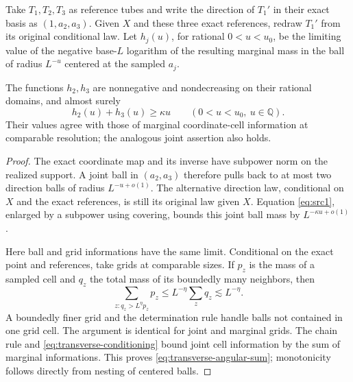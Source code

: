Take $T_1,T_2,T_3$ as reference tubes and write the direction of $T_1'$
in their exact basis as $(1,a_2,a_3)$.  Given $X$ and these three
exact references, redraw $T_1'$ from its original conditional law.
Let $h_j(u)$, for rational $0<u<u_0$, be the limiting value of the
negative base-$L$ logarithm of the resulting marginal mass in the
ball of radius $L^{-u}$ centered at the sampled $a_j$.

\begin{lemma}\label{lem:transverse-angular-information}
The functions $h_2,h_3$ are nonnegative and nondecreasing on their
rational domains, and almost surely
\begin{equation}\label{eq:transverse-angular-sum}
 h_2(u)+h_3(u)\ge\kappa u\qquad(0<u<u_0,\ u\in\mathbb Q).
\end{equation}
Their values agree with those of marginal coordinate-cell information
at comparable resolution; the analogous joint assertion also holds.
\end{lemma}

\begin{proof}
The exact coordinate map and its inverse have subpower norm on the
realized support.  A joint ball in $(a_2,a_3)$ therefore pulls back
to at most two direction balls of radius $L^{-u+o(1)}$.  The
alternative direction law, conditional on $X$ and the exact
references, is still its original law given $X$.  Equation
\eqref{eq:src1}, enlarged by a subpower using covering, bounds this
joint ball mass by $L^{-\kappa u+o(1)}$.

Here ball and grid informations have the same limit.  Conditional
on the exact point and references, take grids at comparable sizes.
If $p_z$ is the mass of a sampled cell and $q_z$ the total mass of
its boundedly many neighbors, then
\[
 \sum_{z:q_z>L^\eta p_z}p_z
       \le L^{-\eta}\sum_zq_z\lesssim L^{-\eta}.
\]
A boundedly finer grid and the determination rule handle balls not
contained in one grid cell.  The argument is identical for joint
and marginal grids.  The chain rule and
\eqref{eq:transverse-conditioning} bound joint cell information by
the sum of marginal informations.  This proves
\eqref{eq:transverse-angular-sum}; monotonicity follows directly
from nesting of centered balls.
\end{proof}

